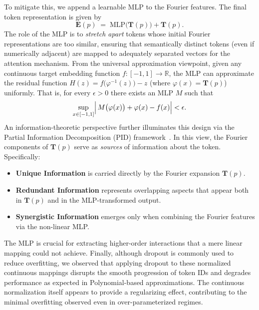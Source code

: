 \documentclass{article}
\begin{document}
To mitigate this, we append a learnable MLP to the Fourier features. The final token representation is given by
\[
\mathbf{E}(p) \;=\; \text{MLP}\bigl(\mathbf{T}(p)\bigr) + \mathbf{T}(p).
\]
The role of the MLP is to \emph{stretch apart} tokens whose initial Fourier representations are too similar, ensuring that semantically distinct tokens (even if numerically adjacent) are mapped to adequately separated vectors for the attention mechanism. From the universal approximation viewpoint, given any continuous target embedding function \(f: [-1,1] \to \mathbb{R}\), the MLP can approximate the residual function \(H(z)=f\bigl(\varphi^{-1}(z)\bigr)-z\) (where \(\varphi(x)=\mathbf{T}(p)\)) uniformly. That is, for every \(\epsilon>0\) there exists an MLP \(M\) such that
\[
\sup_{x \in [-1, 1]} \Bigl|\, M\bigl(\varphi(x)\bigr) + \varphi(x) - f(x) \Bigr| < \epsilon.
\]
An information-theoretic perspective further illuminates this design via the Partial Information Decomposition (PID) framework~\cite{williams2010nonnegative, bertschinger2013quantifying}. In this view, the Fourier components of \(\mathbf{T}(p)\) serve as \emph{sources} of information about the token. Specifically:
\begin{itemize}
    \item \textbf{Unique Information} is carried directly by the Fourier expansion \(\mathbf{T}(p)\).
    \item \textbf{Redundant Information} represents overlapping aspects that appear both in \(\mathbf{T}(p)\) and in the MLP-transformed output.
    \item \textbf{Synergistic Information} emerges only when combining the Fourier features via the non-linear MLP.
\end{itemize}
The MLP is crucial for extracting higher-order interactions that a mere linear mapping could not achieve.
Finally, although dropout is commonly used to reduce overfitting, we observed that applying dropout to these normalized continuous mappings disrupts the smooth progression of token IDs and degrades performance as expected in Polynomial-based approximations. The continuous normalization itself appears to provide a regularizing effect, contributing to the minimal overfitting observed even in over-parameterized regimes.
\end{document}
